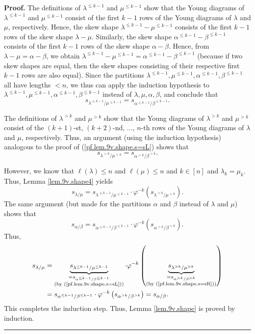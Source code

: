 \documentclass[numbers=enddot,12pt,final,onecolumn,notitlepage]{scrartcl}%
\theoremstyle{definition}
\newenvironment{proof}[1][Proof]{\noindent\textbf{#1.} }{\ \rule{0.5em}{0.5em}}
\begin{document}
\begin{enumerate}
\begin{proof}
The definitions of $\lambda^{\leq k-1}$ and $\mu^{\leq k-1}$ show that the
Young diagrams of $\lambda^{\leq k-1}$ and $\mu^{\leq k-1}$ consist of the
first $k-1$ rows of the Young diagrams of $\lambda$ and $\mu$, respectively.
Hence, the skew shape $\lambda^{\leq k-1}-\mu^{\leq k-1}$ consists of the
first $k-1$ rows of the skew shape $\lambda-\mu$. Similarly, the skew shape
$\alpha^{\leq k-1}-\beta^{\leq k-1}$ consists of the first $k-1$ rows of the
skew shape $\alpha-\beta$. Hence, from $\lambda-\mu=\alpha-\beta$, we obtain
$\lambda^{\leq k-1}-\mu^{\leq k-1}=\alpha^{\leq k-1}-\beta^{\leq k-1}$
(because if two skew shapes are equal, then the skew shapes consisting of
their respective first $k-1$ rows are also equal). Since the partitions
$\lambda^{\leq k-1},\mu^{\leq k-1},\alpha^{\leq k-1},\beta^{\leq k-1}$ all
have lengths $<n$, we thus can apply the induction hypothesis to
$\lambda^{\leq k-1},\mu^{\leq k-1},\alpha^{\leq k-1},\beta^{\leq k-1}$ instead
of $\lambda,\mu,\alpha,\beta$, and conclude that%
\begin{equation}
s_{\lambda^{\leq k-1}/\mu^{\leq k-1}}=s_{\alpha^{\leq k-1}/\beta^{\leq k-1}}.
\label{pf.lem.9v.shape.s=sL}%
\end{equation}


The definitions of $\lambda^{>k}$ and $\mu^{>k}$ show that the Young diagrams
of $\lambda^{>k}$ and $\mu^{>k}$ consist of the $\left(  k+1\right)  $-st,
$\left(  k+2\right)  $-nd, $...$, $n$-th rows of the Young diagrams of
$\lambda$ and $\mu$, respectively. Thus, an argument (using the induction
hypothesis) analogous to the proof of (\ref{pf.lem.9v.shape.s=sL}) shows that%
\begin{equation}
s_{\lambda^{>k}/\mu^{>k}}=s_{\alpha^{>k}/\beta^{>k}}.
\label{pf.lem.9v.shape.s=sR}%
\end{equation}


However, we know that $\ell\left(  \lambda\right)  \leq n$ and $\ell\left(
\mu\right)  \leq n$ and $k\in\left[  n\right]  $ and $\lambda_{k}=\mu_{k}$.
Thus, Lemma \ref{lem.9v.shape4} yields%
\[
s_{\lambda/\mu}=s_{\lambda^{\leq k-1}/\mu^{\leq k-1}}\cdot\varphi^{-k}\left(
s_{\lambda^{>k}/\mu^{>k}}\right)  .
\]
The same argument (but made for the partitions $\alpha$ and $\beta$ instead of
$\lambda$ and $\mu$) shows that%
\[
s_{\alpha/\beta}=s_{\alpha^{\leq k-1}/\beta^{\leq k-1}}\cdot\varphi
^{-k}\left(  s_{\alpha^{>k}/\beta^{>k}}\right)  .
\]
Thus,%
\begin{align*}
s_{\lambda/\mu}  &  =\underbrace{s_{\lambda^{\leq k-1}/\mu^{\leq k-1}}%
}_{\substack{=s_{\alpha^{\leq k-1}/\beta^{\leq k-1}}\\\text{(by
(\ref{pf.lem.9v.shape.s=sL}))}}}\cdot\varphi^{-k}\left(
\underbrace{s_{\lambda^{>k}/\mu^{>k}}}_{\substack{=s_{\alpha^{>k}/\beta^{>k}%
}\\\text{(by (\ref{pf.lem.9v.shape.s=sR}))}}}\right) \\
&  =s_{\alpha^{\leq k-1}/\beta^{\leq k-1}}\cdot\varphi^{-k}\left(
s_{\alpha^{>k}/\beta^{>k}}\right)  =s_{\alpha/\beta}.
\end{align*}
This completes the induction step. Thus, Lemma \ref{lem.9v.shape} is proved by induction.
\end{proof}


\end{enumerate}
\end{document}

